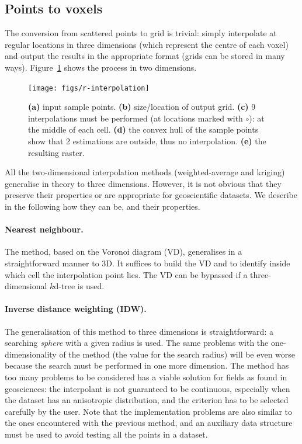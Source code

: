 \subsection{Points to voxels}

The conversion from scattered points to grid is trivial: simply interpolate at regular locations in three dimensions%
(which represent the centre of each voxel) and output the results in the appropriate format (grids can be stored in many ways). 
Figure~\ref{fig:r-interpolation} shows the process in two dimensions.
\begin{figure}
  \centering
  \texttt{[image: figs/r-interpolation]}
  \caption[Interpolations of sample points into a raster]{\textbf{(a)} input sample points. \textbf{(b)} size/location of output grid. \textbf{(c)} 9 interpolations must be performed (at locations marked with $\circ$): at the middle of each cell. \textbf{(d)} the convex hull of the sample points show that 2 estimations are outside, thus no interpolation. \textbf{(e)} the resulting raster.}%
\label{fig:r-interpolation}
\end{figure}

All the two-dimensional interpolation methods (weighted-average and kriging) generalise in theory to three dimensions.
However, it is not obvious that they preserve their properties or are appropriate for geoscientific datasets.
We describe in the following how they can be, and their properties.

\paragraph{Nearest neighbour.} 
The method, based on the Voronoi diagram (VD),%
generalises in a straightforward manner to 3D.
It suffices to build the VD and to identify inside which cell the interpolation point lies.
The VD can be bypassed if a three-dimensional $k$d-tree is used.


\paragraph{Inverse distance weighting (\textbf{IDW}).}
The generalisation of this method to three dimensions is straightforward: a searching \emph{sphere} with a given radius is used. 
The same problems with the one-dimensionality of the method (the value for the search radius) will be even worse because the search must be performed in one more dimension. 
The method has too many problems to be considered  has a viable solution for fields as found in geosciences: the interpolant is not guaranteed to be continuous, especially when the dataset has an anisotropic distribution, 
and the criterion has to be selected carefully by the user.
Note that the implementation problems are also similar to the ones encountered with the previous method, and an auxiliary data structure must be used to avoid testing all the points in a dataset.


